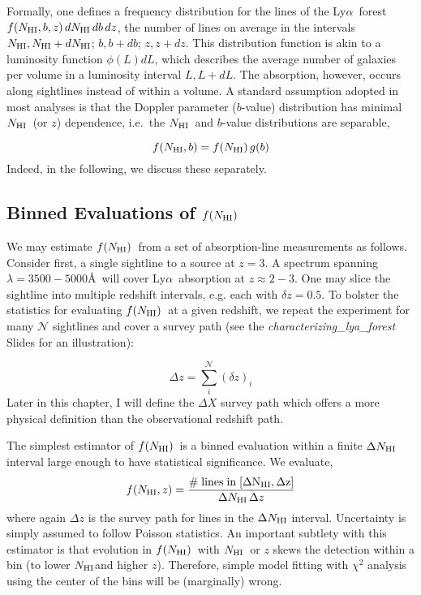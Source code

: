 \documentclass[graybox]{svmult}
\def\lya{Ly$\alpha$}
\def\smm{\sum\limits}
\newcommand{\mnhi}{N_{\rm HI}}
\newcommand{\nhi}{$\mnhi$}
\def\mfnhi{f(\mnhi)}
\def\fnhi{$\mfnhi$}
\begin{document}
Formally, one defines a frequency distribution for the
lines of the \lya\ forest
$f(\mnhi, b, z) \, d\mnhi \, db \, dz $, the number of lines on
average in the intervals $\mnhi, \mnhi+d\mnhi$; $b, b+db$; $z, z+dz$.
This distribution function is
akin to a luminosity function $\phi(L) dL$, which describes
the average number of galaxies per volume in a luminosity interval $L, L+dL$.
The absorption, however, occurs along 
sightlines instead of within a volume.  
A standard assumption adopted in most analyses is that
the Doppler parameter ($b$-value) distribution has 
minimal \nhi\ (or $z$) dependence, i.e.\ the \nhi\ and $b$-value
distributions are separable,

\begin{equation}
f(\mnhi,b) = \mfnhi \, g(b)
\end{equation}
Indeed, in the following, we discuss these separately.

\subsection{Binned Evaluations of \fnhi}
We may estimate \fnhi\ from a set of absorption-line 
measurements as follows. Consider first, a single sightline
to a source at $z=3$.  A spectrum spanning $\lambda = 3500-5000$\AA\
will cover \lya\ absorption at $z \approx 2-3$.
One may slice the sightline into multiple redshift intervals,
e.g. each with $\delta z = 0.5$.  To bolster the statistics
for evaluating \fnhi\ at a given redshift, we repeat the
experiment for many $\mathcal{N}$
sightlines and cover a survey path 
(see the {\it characterizing\_lya\_forest} Slides for
an illustration):

\begin{equation}
\Delta z = \smm_i^{\mathcal{N}} (\delta z)_i
\label{eqn:survey_path}
\end{equation}
Later in this chapter,
I will define the $\Delta X$ survey path which offers
a more physical definition than the observational redshift path.

The simplest estimator of \fnhi\ is a binned evaluation
within a finite $\Delta \mnhi$ interval
large enough to have statistical significance.
We evaluate,
\begin{equation}
f(\mnhi,z) = \frac{\rm \# \; lines \; in \; [\Delta \mnhi,\Delta z]}{
\Delta\mnhi \, \Delta z}
 \end{equation}
where again $\Delta z$ is the survey path for lines
in the $\Delta \mnhi$ interval.  Uncertainty is simply
assumed to follow Poisson statistics. 
An important subtlety with this estimator is that 
evolution in \fnhi\ with \nhi\ or $z$ 
skews the detection within a bin (to lower \nhi and higher $z$).
Therefore, simple model fitting with $\chi^2$ analysis using the 
center of the bins will be (marginally) wrong.
\end{document}
